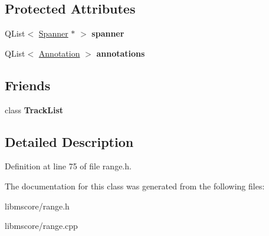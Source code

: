 \subsection*{Protected Attributes}
\begin{DoxyCompactItemize}
\item 
\mbox{\label{class_ms_1_1_score_range_a8aba6375c5e8369af688d10f8bcfaca2}} 
Q\+List$<$ \hyperlink{class_ms_1_1_spanner}{Spanner} $\ast$ $>$ {\bfseries spanner}
\item 
\mbox{\label{class_ms_1_1_score_range_abba60d5a6cb5498d93db234d08ebfc64}} 
Q\+List$<$ \hyperlink{struct_ms_1_1_annotation}{Annotation} $>$ {\bfseries annotations}
\end{DoxyCompactItemize}
\subsection*{Friends}
\begin{DoxyCompactItemize}
\item 
\mbox{\label{class_ms_1_1_score_range_a1116d86962c5a12bd869eb106010b791}} 
class {\bfseries Track\+List}
\end{DoxyCompactItemize}


\subsection{Detailed Description}


Definition at line 75 of file range.\+h.



The documentation for this class was generated from the following files\+:\begin{DoxyCompactItemize}
\item 
libmscore/range.\+h\item 
libmscore/range.\+cpp\end{DoxyCompactItemize}
